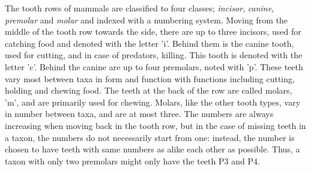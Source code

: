 \documentclass[english,twoside,openright]{UH_DS_MSc}
\begin{document}
The tooth rows of mammals are classified to four classes; \textit{incisor}, \textit{canine}, \textit{premolar}
and \textit{molar} and indexed with a numbering system. Moving from the middle of the tooth row
towards the side, there are up to three 
incisors, used for catching food and denoted with the letter 'i'. Behind them is the canine tooth, used for cutting, and 
in case of predators, killing. This tooth is denoted with the letter 'c'. Behind the canine are up to four premolars, noted with 'p'. These 
teeth vary most between taxa in form and function with functions including cutting, holding and chewing food.
The teeth at the back of the row are called molars, 'm', and are primarily used for chewing. Molars, like the other tooth types, 
vary in number between taxa, and are at most three. The numbers are always increasing when moving back in the tooth row, but in
 the case of missing teeth in a taxon, the numbers do not necessarily start from one: instead, the number is chosen to 
have teeth with same numbers as alike each other as possible. Thus, a taxon with only two premolars might only have the teeth P3 and P4.
\end{document}
